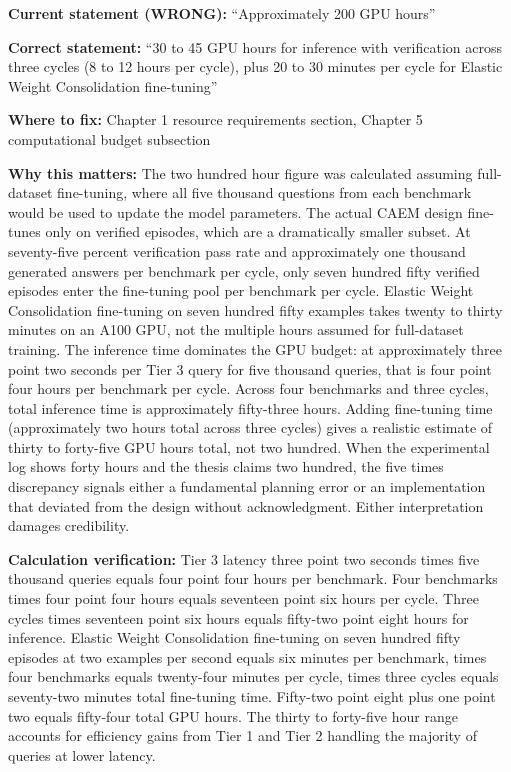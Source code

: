 \documentclass[11pt,a4paper]{article}
\newcommand{\criticalbox}[2]{%
\begin{tcolorbox}[enhanced,breakable,
  colback=LightCrimson,colframe=Crimson,boxrule=1.5pt,arc=4pt,
  left=8pt,right=8pt,top=6pt,bottom=6pt,
  title={\bfseries\small\color{white}#1},
  attach boxed title to top left={yshift=-2mm,xshift=6mm},
  boxed title style={colback=Crimson,arc=3pt,boxrule=0pt,
    left=4pt,right=4pt,top=2pt,bottom=2pt}]
#2
\end{tcolorbox}}
\begin{document}
\criticalbox{CORRECTION 1: GPU Hours Estimate}{
\textbf{Current statement (WRONG):} ``Approximately 200 GPU hours''

\textbf{Correct statement:} ``30 to 45 GPU hours for inference with verification across three cycles (8 to 12 hours per cycle), plus 20 to 30 minutes per cycle for Elastic Weight Consolidation fine-tuning''

\textbf{Where to fix:} Chapter 1 resource requirements section, Chapter 5 computational budget subsection

\textbf{Why this matters:} The two hundred hour figure was calculated assuming full-dataset fine-tuning, where all five thousand questions from each benchmark would be used to update the model parameters. The actual CAEM design fine-tunes only on verified episodes, which are a dramatically smaller subset. At seventy-five percent verification pass rate and approximately one thousand generated answers per benchmark per cycle, only seven hundred fifty verified episodes enter the fine-tuning pool per benchmark per cycle. Elastic Weight Consolidation fine-tuning on seven hundred fifty examples takes twenty to thirty minutes on an A100 GPU, not the multiple hours assumed for full-dataset training. The inference time dominates the GPU budget: at approximately three point two seconds per Tier 3 query for five thousand queries, that is four point four hours per benchmark per cycle. Across four benchmarks and three cycles, total inference time is approximately fifty-three hours. Adding fine-tuning time (approximately two hours total across three cycles) gives a realistic estimate of thirty to forty-five GPU hours total, not two hundred. When the experimental log shows forty hours and the thesis claims two hundred, the five times discrepancy signals either a fundamental planning error or an implementation that deviated from the design without acknowledgment. Either interpretation damages credibility.

\textbf{Calculation verification:} Tier 3 latency three point two seconds times five thousand queries equals four point four hours per benchmark. Four benchmarks times four point four hours equals seventeen point six hours per cycle. Three cycles times seventeen point six hours equals fifty-two point eight hours for inference. Elastic Weight Consolidation fine-tuning on seven hundred fifty episodes at two examples per second equals six minutes per benchmark, times four benchmarks equals twenty-four minutes per cycle, times three cycles equals seventy-two minutes total fine-tuning time. Fifty-two point eight plus one point two equals fifty-four total GPU hours. The thirty to forty-five hour range accounts for efficiency gains from Tier 1 and Tier 2 handling the majority of queries at lower latency.
}
\end{document}
